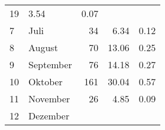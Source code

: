 \begin{longtable}{lXrrr}
       \num{19} &
       \num[round-mode=places,round-precision=2]{3,54} &
         \num[round-mode=places,round-precision=2]{0,07} \\

     7 &
     \multicolumn{1}{X}{ Juli   } &


       \num{34} &
       \num[round-mode=places,round-precision=2]{6,34} &
         \num[round-mode=places,round-precision=2]{0,12} \\

     8 &
     \multicolumn{1}{X}{ August   } &


       \num{70} &
       \num[round-mode=places,round-precision=2]{13,06} &
         \num[round-mode=places,round-precision=2]{0,25} \\

     9 &
     \multicolumn{1}{X}{ September   } &


       \num{76} &
       \num[round-mode=places,round-precision=2]{14,18} &
         \num[round-mode=places,round-precision=2]{0,27} \\

     10 &
     \multicolumn{1}{X}{ Oktober   } &


       \num{161} &
       \num[round-mode=places,round-precision=2]{30,04} &
         \num[round-mode=places,round-precision=2]{0,57} \\

     11 &
     \multicolumn{1}{X}{ November   } &


       \num{26} &
       \num[round-mode=places,round-precision=2]{4,85} &
         \num[round-mode=places,round-precision=2]{0,09} \\

     12 &
     \multicolumn{1}{X}{ Dezember   } &



\end{longtable}
